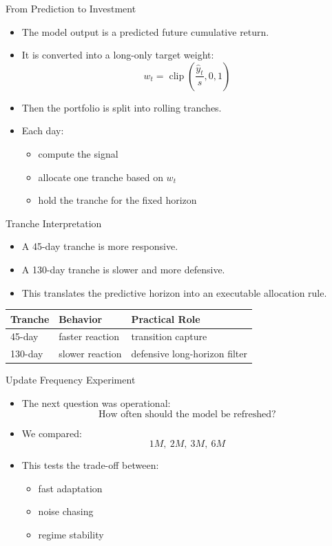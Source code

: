 \documentclass[aspectratio=169]{beamer}
\begin{document}
\begin{frame}{From Prediction to Investment}
  \begin{itemize}
    \item The model output is a predicted future cumulative return.
    \item It is converted into a long-only target weight:
    \[
      w_t = \operatorname{clip}\left(\frac{\hat{y}_t}{s}, 0, 1\right)
    \]
    \item Then the portfolio is split into rolling tranches.
    \item Each day:
    \begin{itemize}
      \item compute the signal
      \item allocate one tranche based on \(w_t\)
      \item hold the tranche for the fixed horizon
    \end{itemize}
  \end{itemize}
\end{frame}

\begin{frame}{Tranche Interpretation}
  \begin{itemize}
    \item A 45-day tranche is more responsive.
    \item A 130-day tranche is slower and more defensive.
    \item This translates the predictive horizon into an executable allocation rule.
  \end{itemize}

  \vspace{0.8em}
  \small
  \begin{tabular}{lll}
    \toprule
    Tranche & Behavior & Practical Role \\
    \midrule
    45-day & faster reaction & transition capture \\
    130-day & slower reaction & defensive long-horizon filter \\
    \bottomrule
  \end{tabular}
\end{frame}

\begin{frame}{Update Frequency Experiment}
  \begin{itemize}
    \item The next question was operational:
    \[
      \text{How often should the model be refreshed?}
    \]
    \item We compared:
    \[
      1M,\ 2M,\ 3M,\ 6M
    \]
    \item This tests the trade-off between:
    \begin{itemize}
      \item fast adaptation
      \item noise chasing
      \item regime stability
    \end{itemize}
  \end{itemize}
\end{frame}
\end{document}
